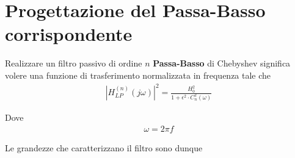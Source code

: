 \documentclass[a4paper,12pt]{report}
\begin{document}
\newpage

\section{Progettazione del Passa-Basso corrispondente}

Realizzare un filtro passivo di ordine $n$ \textbf{Passa-Basso} di Chebyshev significa volere una funzione di trasferimento normalizzata in frequenza tale che
\begin{align}
|H^{(n)}_{LP}(j\omega)|^2 = \frac{H_0^2}{1 + \epsilon^2 \cdot C_n^2(\omega)}
\end{align}

Dove
\begin{align}
\omega = 2\pi f
\end{align}

Le grandezze che caratterizzano il filtro sono dunque
\end{document}
